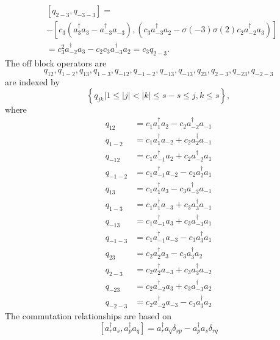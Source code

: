 \documentclass[aps,preprint]{revtex4}%
\begin{document}
\begin{align}
&  \left[  q_{2-3},q_{-3-3}\right]  =\nonumber\\
&  -\left[  c_{3}\left(  a_{3}^{\dagger}a_{3}-a_{-3}^{\dagger}a_{-3}\right)
,\left(  c_{3}a_{-3}^{\dagger}a_{2}-\sigma\left(  -3\right)  \sigma\left(
2\right)  c_{2}a_{-2}^{\dagger}a_{3}\right)  \right] \nonumber\\
&  =c_{3}^{2}a_{-2}^{\dagger}a_{3}-c_{2}c_{3}a_{-3}^{\dagger}a_{2}%
=c_{3}q_{2-3}.
\end{align}
The off block operators are
\begin{equation}
q_{12},q_{1-2},q_{13},q_{1-3},q_{-12},q_{-1-2},q_{-13},q_{-13},q_{23}%
,q_{2-3},q_{-23},q_{-2-3}%
\end{equation}
are indexed by%
\begin{equation}
\left\{  q_{jk}\left\vert 1\leq\left\vert j\right\vert <\left\vert
k\right\vert \leq s\right.  -s\leq j,k\leq s\right\}  ,
\end{equation}
where
\begin{align}
q_{12}  &  =c_{1}a_{1}^{\dagger}a_{2}-c_{2}a_{-2}^{\dagger}a_{-1}\nonumber\\
q_{1-2}  &  =c_{1}a_{1}^{\dagger}a_{-2}+c_{2}a_{2}^{\dagger}a_{-1}\nonumber\\
q_{-12}  &  =c_{1}a_{-1}^{\dagger}a_{2}+c_{2}a_{-2}^{\dagger}a_{1}\nonumber\\
q_{-1-2}  &  =c_{1}a_{-1}^{\dagger}a_{-2}-c_{2}a_{2}^{\dagger}a_{1}\nonumber\\
q_{13}  &  =c_{1}a_{1}^{\dagger}a_{3}-c_{3}a_{-3}^{\dagger}a_{-1}\nonumber\\
q_{1-3}  &  =c_{1}a_{1}^{\dagger}a_{-3}+c_{3}a_{3}^{\dagger}a_{-1}\nonumber\\
q_{-13}  &  =c_{1}a_{-1}^{\dagger}a_{3}+c_{3}a_{-3}^{\dagger}a_{1}\nonumber\\
q_{-1-3}  &  =c_{1}a_{-1}^{\dagger}a_{-3}-c_{3}a_{3}^{\dagger}a_{1}\nonumber\\
q_{23}  &  =c_{2}a_{2}^{\dagger}a_{3}-c_{3}a_{3}^{\dagger}a_{2}\nonumber\\
q_{2-3}  &  =c_{2}a_{2}^{\dagger}a_{-3}+c_{3}a_{3}^{\dagger}a_{-2}\nonumber\\
q_{-23}  &  =c_{2}a_{-2}^{\dagger}a_{3}+c_{3}a_{-3}^{\dagger}a_{2}\nonumber\\
q_{-2-3}  &  =c_{2}a_{-2}^{\dagger}a_{-3}-c_{3}a_{3}^{\dagger}a_{2}%
\end{align}
The commutation relationships are based on%
\begin{equation}
\left[  a_{r}^{\dagger}a_{s},a_{p}^{\dagger}a_{q}\right]  =a_{r}^{\dagger
}a_{q}\delta_{sp}-a_{p}^{\dagger}a_{s}\delta_{rq}%
\end{equation}
\end{document}
